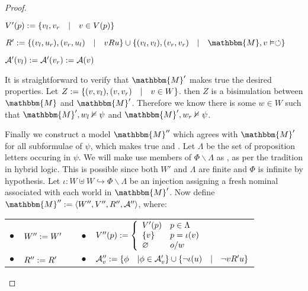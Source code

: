 \begin{proof}
\begin{itemizedot}
    \item $V' (p) := \{v_l, v_r \hspace{1em} | \hspace{1em} v \in V
    (p)\}$
    
    \item $R' \assign \{(v_l, u_r), (v_r, u_l) \hspace{1em} | \hspace{1em} v R
    u\} \cup \{(v_l, v_l), (v_r, v_r) \hspace{1em} | \hspace{1em} \mathbbm{M},
    v \vDash \circlearrowleft\}$
    
    \item $\mathcal{A}' (v_l) := \mathcal{A}' (v_r) := \mathcal{A}
    (v)$
  \end{itemizedot}
  
  
  It is straightforward to verify that $\mathbbm{M}'$ makes true the desired
  properties.  Let $Z := \{(v, v_l), (v, v_r) \hspace{1em} |
  \hspace{1em} v \in W\}$.  then $Z$ is a bisimulation between $\mathbbm{M}$
  and $\mathbbm{M}'$.  Therefore we know there is some $w \in W$ such that
  $\mathbbm{M}', w_l \nvDash \psi$ and $\mathbbm{M}', w_r \nvDash \psi$.
  
  
  
  Finally we construct a model $\mathbbm{M}''$ which agrees with
  $\mathbbm{M}'$ for all subformulae of $\psi$, which makes true
   and .  Let $\Lambda$ be the set of proposition
  letters occuring in $\psi$.  We will make use members of $\Phi \backslash
  \Lambda$ as {}, as per the tradition in hybrid logic.  This
  is possible since both $W'$ and $\Lambda$ are finite and $\Phi$ is infinite
  by hypothesis.  Let $\iota : W \uplus W \hookrightarrow \Phi \backslash
  \Lambda$ be an injection assigning a fresh nominal associated with each
  world in $\mathbbm{M}'$.  Now define $\mathbbm{M}'' \assign \langle W'',
  V'', R'', \mathcal{A}'' \rangle$, where:
  
  
  
  \begin{center}
    \begin{tabular}{lllll}
      $\bullet$ & $W'' := W'$ &  & $\bullet$ & $V'' (p) := \left\{
      \begin{array}{ll}
        V' (p) & p \in \Lambda\\
        \{v\} & p = \iota (v)\\
        \varnothing & o / w
      \end{array} \right.$\\
      $\bullet$ & $R'' := R'$ & {\hspace{3em}} & $\bullet$ &
      $\mathcal{A}''_v := \{\phi \hspace{1em} | \phi \in \mathcal{A}'_v
      \} \cup \{\neg \iota (u) \hspace{1em} | \hspace{1em} \neg v R' u\}$
    \end{tabular}
  \end{center}
  

\end{proof}

